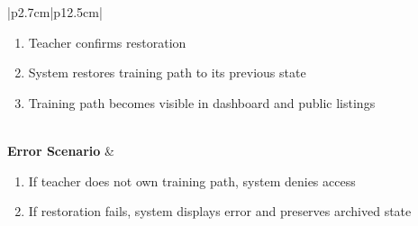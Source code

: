 \begin{table}[H]
\begin{tabular}{|p{2.7cm}|p{12.5cm}|}
\begin{minipage}[t]{\linewidth}
\begin{enumerate}[topsep=0pt,itemsep=1pt,parsep=0pt,partopsep=0pt]
                                          \item Teacher confirms restoration
                                          \item System restores training path to its previous state
                                          \item Training path becomes visible in dashboard and public listings
                                      \end{enumerate}
                                  \end{minipage} \\
        \hline
        \textbf{Error Scenario} & \begin{minipage}[t]{\linewidth}
                                      \begin{enumerate}[topsep=0pt,itemsep=1pt,parsep=0pt,partopsep=0pt]
                                          \item If teacher does not own training path, system denies access
                                          \item If restoration fails, system displays error and preserves archived state
                                      \end{enumerate}
                                  \end{minipage} \\
        \hline
    \end{tabular}
    \label{tab:teacher-restore-tp}
\end{table}
